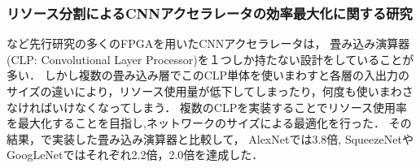 {\subsubsection{リソース分割によるCNNアクセラレータの効率最大化に関する研究\cite{max}}
\cite{optimized}など先行研究の多くのFPGAを用いたCNNアクセラレータは，
畳み込み演算器(CLP: Convolutional Layer Processor)を１つしか持たない設計をしていることが多い．
しかし複数の畳み込み層でこのCLP単体を使いまわすと各層の入出力のサイズの違いにより，リソース使用量が低下してしまったり，何度も使いまわさなければいけなくなってしまう．
複数のCLPを実装することでリソース使用率を最大化することを目指し,ネットワークのサイズによる最適化を行った．
その結果，\cite{optimized}で実装した畳み込み演算器と比較して，
AlexNet\cite{alexnet}では3.8倍, SqueezeNet\cite{squeezenet}やGoogLeNet\cite{googlenet}ではそれぞれ2.2倍，2.0倍を達成した．
}